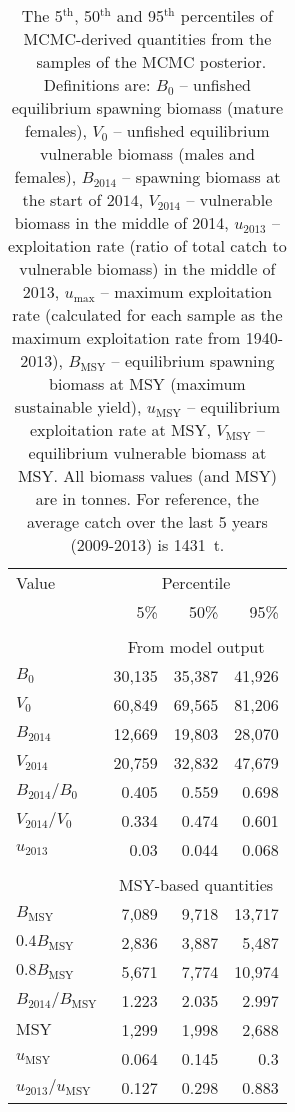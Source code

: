 \documentclass[11pt]{book}
\newcommand{\Bmsy}{B_\mathrm{MSY}}
\begin{document}
\begin{table}[tp]
\centering
\caption{\label{tab:MCMCderived} The 5$^\mathrm{th}$, 50$^\mathrm{th}$ and 95$^\mathrm{th}$ percentiles of MCMC-derived quantities from the \numMCMC~samples of the MCMC posterior. Definitions are: $B_0$ -- unfished equilibrium spawning biomass (mature females), $V_0$ -- unfished equilibrium vulnerable biomass (males and females), $B_{2014}$ -- spawning biomass at the start of $2014$, $V_{2014}$ -- vulnerable biomass in the middle of 2014, $u_{2013}$ -- exploitation rate (ratio of total catch to vulnerable biomass) in the middle of 2013, $u_\mathrm{max}$ -- maximum exploitation rate (calculated for each sample as the maximum exploitation rate from 1940-2013), $\Bmsy$ -- equilibrium spawning biomass at MSY (maximum sustainable yield), $u_\mathrm{MSY}$ -- equilibrium exploitation rate at MSY, $V_\mathrm{MSY}$ -- equilibrium vulnerable biomass at MSY. 
All biomass values (and MSY) are in tonnes. For reference, the average catch over the last 5 years (2009-2013) is 1431~t.}
\begin{tabular}{lrrr} 
\\[-1.0ex]\hline
Value & \multicolumn{3}{c}{Percentile}\\
\cline{2-4}
 & 5\% & 50\% & 95\% \\
\hline 
 & & & \\
& \multicolumn{3}{c}{From model output}\\
$B_0$                  & 30,135 & 35,387 & 41,926 \\
$V_0$                  & 60,849 & 69,565 & 81,206 \\
$B_{2014}$             & 12,669 & 19,803 & 28,070 \\
$V_{2014}$             & 20,759 & 32,832 & 47,679 \\

$B_{2014} / B_0$       & 0.405 & 0.559 & 0.698 \\
$V_{2014} / V_0$     & 0.334 & 0.474 & 0.601 \\

$u_{2013}$             & 0.03 & 0.044 & 0.068 \\
\hline
 & & & \\
& \multicolumn{3}{c}{MSY-based quantities}\\
$B_\mathrm{MSY}$       &  7,089 & 9,718 & 13,717 \\
$0.4 B_\mathrm{MSY}$   &  2,836 & 3,887 & 5,487 \\
$0.8 B_\mathrm{MSY}$   &  5,671 & 7,774 & 10,974 \\
$B_{2014} / B_\mathrm{MSY}$ & 1.223 & 2.035 & 2.997 \\

$\mathrm{MSY}$                    & 1,299 & 1,998 & 2,688 \\
$u_\mathrm{MSY}$       & 0.064 & 0.145 & 0.3 \\
$u_{2013} / u_\mathrm{MSY}$ & 0.127 & 0.298 & 0.883 \\
\hline
\end{tabular}
\end{table}
\end{document}
